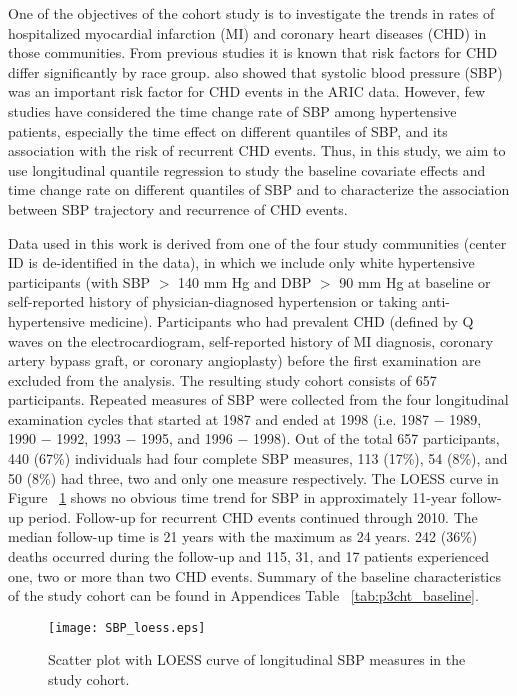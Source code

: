 One of the objectives of the cohort study is to investigate the trends in rates of hospitalized myocardial infarction (MI) and coronary heart diseases (CHD) in those communities. From previous studies it is known that risk factors for CHD differ significantly by race group. \cite{wattanakit2005risk, rodriguez2014systolic} also showed that systolic blood pressure (SBP) was an important risk factor for CHD events in the ARIC data. However, few studies have considered the time change rate of SBP among hypertensive patients, especially the time effect on different quantiles of SBP, and its association with the risk of recurrent CHD events. Thus, in this study, we aim to use longitudinal quantile regression to study the baseline covariate effects and time change rate on different quantiles of SBP and to characterize the association between SBP trajectory and recurrence of CHD events.

Data used in this work is derived from one of the four study communities (center ID is de-identified in the data), in which we include only white hypertensive participants (with SBP $>$ 140 mm Hg and DBP $>$ 90 mm Hg at baseline or self-reported history of physician-diagnosed hypertension or taking anti-hypertensive medicine). Participants who had prevalent CHD (defined by Q waves on the electrocardiogram, self-reported history of MI diagnosis, coronary artery bypass graft, or coronary angioplasty) before the first examination are excluded from the analysis. The resulting study cohort consists of 657 participants. Repeated measures of SBP were collected from the four longitudinal examination cycles that started at 1987 and ended at 1998 (i.e. 1987 $-$ 1989, 1990 $-$ 1992, 1993 $-$ 1995, and 1996 $-$ 1998). Out of the total 657 participants, 440 (67\%) individuals had four complete SBP measures, 113 (17\%), 54 (8\%), and 50 (8\%) had three, two and only one measure respectively. The LOESS curve in Figure ~\ref{fig:sbp_loess} shows no obvious time trend for SBP in approximately 11-year follow-up period. Follow-up for recurrent CHD events continued through 2010. The median follow-up time is 21 years with the maximum as 24 years. 242 (36\%) deaths occurred during the follow-up and 115, 31, and 17 patients experienced one, two or more than two CHD events. Summary of the baseline characteristics of the study cohort can be found in Appendices Table ~\ref{tab:p3cht_baseline}.


\begin{figure}[ht]
\centering
\texttt{[image: SBP\_loess.eps]}
\caption{Scatter plot with LOESS curve of longitudinal SBP measures in the study cohort.}
\label{fig:sbp_loess}
\end{figure}

